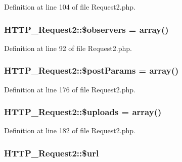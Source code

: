 Definition at line 104 of file Request2.\-php.

\hypertarget{classHTTP__Request2_ab57c87d4bee6cb35be6b976a8ec7ec2f}{
\subsubsection[{\$observers}]{\setlength{\rightskip}{0pt plus 5cm}H\-T\-T\-P\-\_\-\-Request2\-::\$observers = array()\hspace{0.3cm}{\ttfamily [protected]}}}\label{classHTTP__Request2_ab57c87d4bee6cb35be6b976a8ec7ec2f}


Definition at line 92 of file Request2.\-php.

\hypertarget{classHTTP__Request2_a77aa571439401e1cd2adc407f4bdc222}{
\subsubsection[{\$post\-Params}]{\setlength{\rightskip}{0pt plus 5cm}H\-T\-T\-P\-\_\-\-Request2\-::\$post\-Params = array()\hspace{0.3cm}{\ttfamily [protected]}}}\label{classHTTP__Request2_a77aa571439401e1cd2adc407f4bdc222}


Definition at line 176 of file Request2.\-php.

\hypertarget{classHTTP__Request2_ad95bfff299ff890d4f554754428337e5}{
\subsubsection[{\$uploads}]{\setlength{\rightskip}{0pt plus 5cm}H\-T\-T\-P\-\_\-\-Request2\-::\$uploads = array()\hspace{0.3cm}{\ttfamily [protected]}}}\label{classHTTP__Request2_ad95bfff299ff890d4f554754428337e5}


Definition at line 182 of file Request2.\-php.

\hypertarget{classHTTP__Request2_acf16b4d76ebd04a80dc8e140303ad895}{
\subsubsection[{\$url}]{\setlength{\rightskip}{0pt plus 5cm}H\-T\-T\-P\-\_\-\-Request2\-::\$url\hspace{0.3cm}{\ttfamily [protected]}}}\label{classHTTP__Request2_acf16b4d76ebd04a80dc8e140303ad895}


